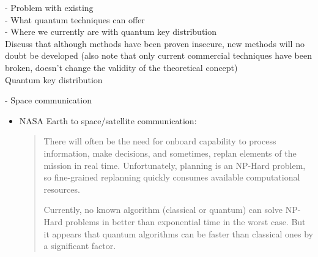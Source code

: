 \documentclass[runningheads,a4paper]{llncs}
\begin{document}
- Problem with existing\\
- What quantum techniques can offer\\
- Where we currently are with quantum key distribution\\
  Discuss that although methods have been proven insecure, new methods will no doubt be developed (also note that only current commercial techniques have been broken, doesn't change the validity of the theoretical concept)\\

Quantum key distribution 

- Space communication

\begin{itemize}

\item{NASA Earth to space/satellite communication}\cite{Hughes:2000uq}:

\begin{quotation} There will often be the need for onboard capability to process information, make decisions, and sometimes, replan elements of the mission in real time. Unfortunately, planning is an NP-Hard problem, so fine-grained replanning quickly consumes available computational resources.

Currently, no known algorithm (classical or quantum) can solve NP-Hard problems in better than exponential time in the worst case. But it appears that quantum algorithms can be faster than classical ones by a significant factor.\end{quotation}

\end{itemize}



\end{document}

